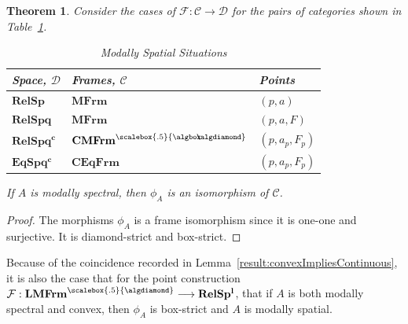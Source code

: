 \documentclass{article}[a4paper]
\newtheorem{theorem}{Theorem}%
\theoremstyle{definition}
\newcommand{\Ccal}{\mathcal{C}} %
\newcommand{\Dcal}{\mathcal{D}} %
\newcommand{\Fcal}{\mathcal{F}} %
\newcommand{\rels}{\mathbf{RelS}}
\newcommand{\relsp}{\mathbf{RelSp}}
\newcommand{\relspl}{\mathbf{RelSp^l}}
\newcommand{\relspc}{\mathbf{RelSp^c}}
\newcommand{\relspq}{\mathbf{RelSpq}}
\newcommand{\relspqu}{\mathbf{RelSpq^u}}
\newcommand{\relspql}{\mathbf{RelSpq^l}}
\newcommand{\relspqc}{\mathbf{RelSpq^c}}
\newcommand{\eqspqc}{\mathbf{EqSpq^c}}
\newcommand{\mfrm}{\mathbf{MFrm}}
\newcommand{\mfrmbs}{\mathbf{MFrm}^{\scalebox{.5}{\algbox}}}
\newcommand{\mfrmds}{\mathbf{MFrm}^{\scalebox{.5}{\algdiamond}}}
\newcommand{\lmfrmds}{\mathbf{LMFrm}^{\scalebox{.5}{\algdiamond}}}
\newcommand{\cmfrms}{\mathbf{CMFrm}^{\scalebox{.5}{\algbox\!\!\!\algdiamond}}}
\newcommand{\ceqfrm}{\mathbf{CEqFrm}}
\begin{document}
\begin{theorem}
Consider the cases of $\Fcal: \Ccal \longrightarrow \Dcal$ for the pairs of categories shown in Table~\ref{table:modalSpatiality}. 
\begin{table}[ht]
\begin{center}
\begin{tabular}{|l|l|l|}
\hline
Space,  $\Dcal$    & 
Frames, $\Ccal$  &
Points \\ 
\hline
$\relsp$   & $\mfrm$ & $(p,a)$ \\
$\relspq$  & $\mfrm$ & $(p,a,F)$ \\ 
$\relspqc$ & $\cmfrms$ & $(p,a_p,F_p)$\\
$\eqspqc$  & $\ceqfrm$ & $(p,a_p,F_p)$ \\
\hline
\end{tabular}
\caption{Modally Spatial Situations}
\label{table:modalSpatiality}
\end{center}
\end{table} 
If $A$ is modally spectral, then $\phi_A$ is an isomorphism of $\Ccal$. 
\end{theorem}

\begin{proof}
The morphisms $\phi _A$ is a frame isomorphism since it is one-one and surjective. It is diamond-strict and box-strict. 
\end{proof}

Because of the coincidence recorded in Lemma~\ref{result:convexImpliesContinuous}, it is also the case that for the point construction $\Fcal : \lmfrmds \longrightarrow \relspl$, that if $A$ is both modally spectral and convex, then $\phi_A$ is box-strict and $A$ is modally spatial.
\end{document}
